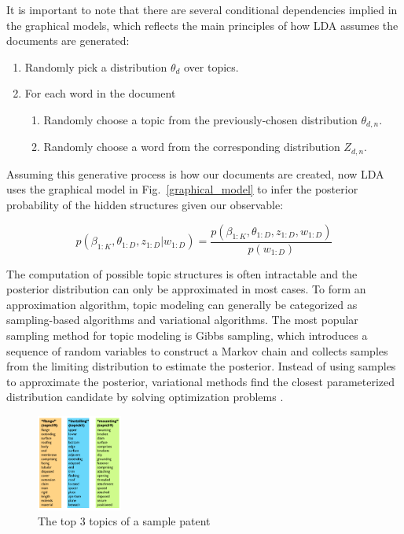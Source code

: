 \documentclass[conference]{IEEEtran}
\begin{document}
It is important to note that there are several conditional dependencies implied in the graphical models, which reflects the main principles of how LDA assumes the documents are generated:

\begin{enumerate}
\item Randomly pick a distribution $\theta_d$ over topics.
\item For each word in the document
	\begin{enumerate}
	\item Randomly choose a topic from the previously-chosen distribution $\theta_{d,n}$.
	\item Randomly choose a word from the corresponding distribution $Z_{d,n}$.
	\end{enumerate}
\end{enumerate}

Assuming this generative process is how our documents are created, now LDA uses the graphical model in Fig.~\ref{graphical_model} to infer the posterior probability of the hidden structures given our observable:

\begin{equation*}
p(\beta_{1:K}, \theta_{1:D}, z_{1:D} | w_{1:D}) = \frac{p(\beta_{1:K}, \theta_{1:D}, z_{1:D}, w_{1:D})}{p(w_{1:D})}
\end{equation*}

The computation of possible topic structures is often intractable and the posterior distribution can only be approximated in most cases. To form an approximation algorithm, topic modeling can generally be categorized as sampling-based algorithms and variational algorithms. The most popular sampling method for topic modeling is Gibbs sampling, which introduces a sequence of random variables to construct a Markov chain and collects samples from the limiting distribution to estimate the posterior. Instead of using samples to approximate the posterior, variational methods find the closest parameterized distribution candidate by solving optimization problems \cite{lda2003} \cite{bach2010}.

\begin{figure}[h]
	\center
	\includegraphics[width=0.25\textwidth]{fig/topics.png}
	\caption{The top 3 topics of a sample patent}
	\label{top3topics}
\end{figure}
\end{document}
